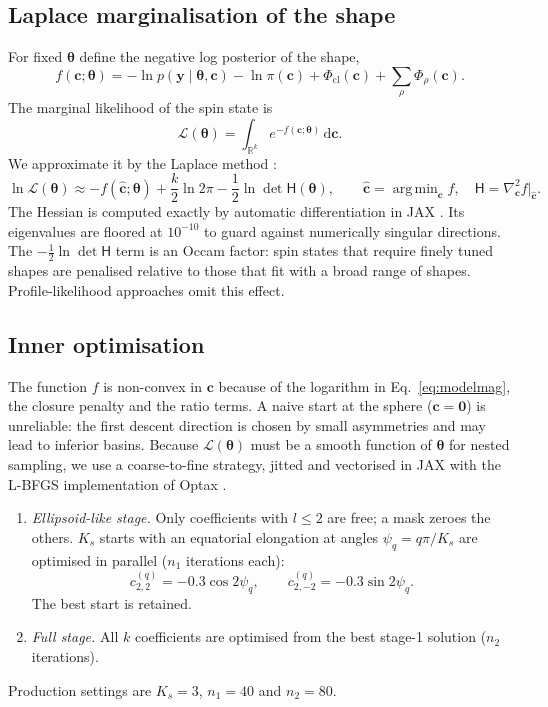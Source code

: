 \documentclass[11pt,a4paper]{article}
\theoremstyle{remark}
\newcommand{\vect}[1]{\bm{#1}}
\newcommand{\R}{\mathbb{R}}
\newcommand{\dd}{\,\mathrm{d}}
\DeclareMathOperator*{\argmin}{arg\,min}
\begin{document}
\subsection{Laplace marginalisation of the shape}
\label{sec:laplace}
For fixed $\vect\theta$ define the negative log posterior of the shape,
\begin{equation}
  f(\vect c;\vect\theta) = -\ln p(\vect y\mid\vect\theta,\vect c)-\ln\pi(\vect c)+\Phi_{\mathrm{cl}}(\vect c)+\sum_\rho\Phi_\rho(\vect c).
\end{equation}
The marginal likelihood of the spin state is
\begin{equation}
  \mathcal L(\vect\theta)=\int_{\R^k}e^{-f(\vect c;\vect\theta)}\dd\vect c .
\end{equation}
We approximate it by the Laplace method \citep{tierney1986}:
\begin{equation}
  \ln\mathcal L(\vect\theta)\approx -f(\hat{\vect c};\vect\theta)+\frac k2\ln 2\pi-\frac12\ln\det\mathsf H(\vect\theta),
  \qquad
  \hat{\vect c}=\argmin_{\vect c}f,\quad \mathsf H=\nabla^2_{\vect c}f\big|_{\hat{\vect c}} .
  \label{eq:laplace}
\end{equation}
The Hessian is computed exactly by automatic differentiation in JAX \citep{jax2018}. Its eigenvalues
are floored at $10^{-10}$ to guard against numerically singular directions. The
$-\tfrac12\ln\det\mathsf H$ term is an Occam factor: spin states that require finely tuned shapes are
penalised relative to those that fit with a broad range of shapes. Profile-likelihood approaches omit
this effect.

\subsection{Inner optimisation}
\label{sec:inner}
The function $f$ is non-convex in $\vect c$ because of the logarithm in Eq.~\eqref{eq:modelmag}, the
closure penalty and the ratio terms. A naive start at the sphere ($\vect c=\vect 0$) is unreliable: the
first descent direction is chosen by small asymmetries and may lead to inferior basins. Because
$\mathcal L(\vect\theta)$ must be a smooth function of $\vect\theta$ for nested sampling, we use a
coarse-to-fine strategy, jitted and vectorised in JAX with the L-BFGS implementation of Optax
\citep{liu1989,optax2020}.

\begin{enumerate}[nosep]
\item \emph{Ellipsoid-like stage.} Only coefficients with $l\le2$ are free; a mask zeroes the others.
  $K_s$ starts with an equatorial elongation at angles $\psi_q=q\pi/K_s$ are optimised in parallel
  ($n_1$ iterations each):
  \begin{equation}
    c_{2,2}^{(q)}=-0.3\cos2\psi_q,\qquad c_{2,-2}^{(q)}=-0.3\sin2\psi_q .
  \end{equation}
  The best start is retained.
\item \emph{Full stage.} All $k$ coefficients are optimised from the best stage-1 solution
  ($n_2$ iterations).
\end{enumerate}
Production settings are $K_s=3$, $n_1=40$ and $n_2=80$.
\end{document}
